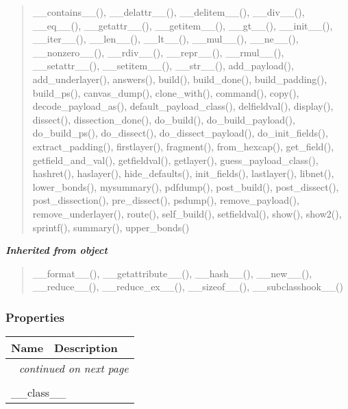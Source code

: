 \begin{quote}
\_\_contains\_\_(), \_\_delattr\_\_(), \_\_delitem\_\_(), \_\_div\_\_(), \_\_eq\_\_(), \_\_getattr\_\_(), \_\_getitem\_\_(), \_\_gt\_\_(), \_\_init\_\_(), \_\_iter\_\_(), \_\_len\_\_(), \_\_lt\_\_(), \_\_mul\_\_(), \_\_ne\_\_(), \_\_nonzero\_\_(), \_\_rdiv\_\_(), \_\_repr\_\_(), \_\_rmul\_\_(), \_\_setattr\_\_(), \_\_setitem\_\_(), \_\_str\_\_(), add\_payload(), add\_underlayer(), answers(), build(), build\_done(), build\_padding(), build\_ps(), canvas\_dump(), clone\_with(), command(), copy(), decode\_payload\_as(), default\_payload\_class(), delfieldval(), display(), dissect(), dissection\_done(), do\_build(), do\_build\_payload(), do\_build\_ps(), do\_dissect(), do\_dissect\_payload(), do\_init\_fields(), extract\_padding(), firstlayer(), fragment(), from\_hexcap(), get\_field(), getfield\_and\_val(), getfieldval(), getlayer(), guess\_payload\_class(), hashret(), haslayer(), hide\_defaults(), init\_fields(), lastlayer(), libnet(), lower\_bonds(), mysummary(), pdfdump(), post\_build(), post\_dissect(), post\_dissection(), pre\_dissect(), psdump(), remove\_payload(), remove\_underlayer(), route(), self\_build(), setfieldval(), show(), show2(), sprintf(), summary(), upper\_bonds()
\end{quote}

\large{\textbf{\textit{Inherited from object}}}

\begin{quote}
\_\_format\_\_(), \_\_getattribute\_\_(), \_\_hash\_\_(), \_\_new\_\_(), \_\_reduce\_\_(), \_\_reduce\_ex\_\_(), \_\_sizeof\_\_(), \_\_subclasshook\_\_()
\end{quote}


  \subsubsection{Properties}

    \vspace{-1cm}
\hspace{\varindent}\begin{longtable}{|p{\varnamewidth}|p{\vardescrwidth}|l}
\cline{1-2}
\cline{1-2} \centering \textbf{Name} & \centering \textbf{Description}& \\
\cline{1-2}
\endhead\cline{1-2}\multicolumn{3}{r}{\small\textit{continued on next page}}\\\endfoot\cline{1-2}
\endlastfoot\multicolumn{2}{|l|}{\textit{Inherited from object}}\\
\multicolumn{2}{|p{\varwidth}|}{\raggedright \_\_class\_\_}\\
\cline{1-2}
\end{longtable}


